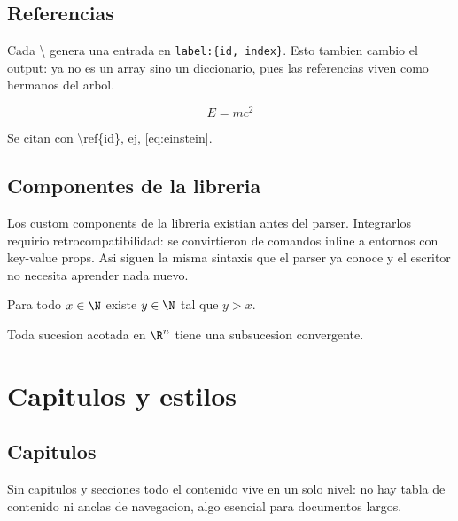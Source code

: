 \documentclass{article}
\begin{document}
  \section{ Referencias }

  Cada \backslash{}
  genera una entrada en \texttt{label:\{id, index\}}.
  Esto tambien cambio el output: ya no es un array sino un diccionario, pues
  las referencias viven como hermanos del arbol.

  \begin{equation}
      E = mc^2
  \end{equation}
  \label{eq:einstein}

  Se citan con \backslash ref\{id\}, ej, \ref{eq:einstein}.

  \section{ Componentes de la libreria }

  Los custom components de la libreria existian antes del parser. Integrarlos
  requirio retrocompatibilidad: se convirtieron de comandos inline a entornos
  con key-value props. Asi siguen la misma sintaxis que el parser ya conoce y
  el escritor no necesita aprender nada nuevo.

  \begin{axiom}[title=Arquimedes, label=ax-arq]
    Para todo $x \in \N$ existe $y \in \N$ tal que $y > x$.
  \end{axiom}

  \begin{theorem}[title=Bolzano-Weierstrass, label=th-bw]
    Toda sucesion acotada en $\R^n$ tiene una subsucesion convergente.
  \end{theorem}



  \chapter{ Capitulos y estilos }

  \section{ Capitulos }

  Sin capitulos y secciones todo el contenido vive en un solo nivel: no hay
  tabla de contenido ni anclas de navegacion, algo esencial para documentos largos.
\end{document}
